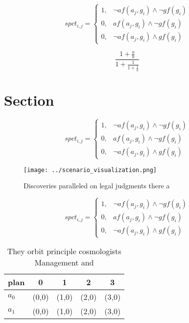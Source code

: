 \documentclass[a4paper]{article}
\begin{document}
\begin{equation}
spct_{i,j} =
\begin{cases}
1, & \text{$\neg af(a_j,g_i) \wedge \neg gf(g_i)$}\\
0, & \text{$af(a_j,g_i) \wedge \neg gf(g_i)$}\\
0, & \text{$\neg af(a_j,g_i) \wedge gf(g_i)$}
\end{cases}
\end{equation}

\[ \frac{1+\frac{a}{b}}{1+\frac{1}{1+\frac{1}{a}}} \]

\section{Section}

\begin{equation}
spct_{i,j} =
\begin{cases}
1, & \text{$\neg af(a_j,g_i) \wedge \neg gf(g_i)$}\\
0, & \text{$af(a_j,g_i) \wedge \neg gf(g_i)$}\\
0, & \text{$\neg af(a_j,g_i) \wedge gf(g_i)$}
\end{cases}
\end{equation}

\begin{figure}
\centering
\texttt{[image: ../scenario\_visualization.png]}
\caption{Discoveries paralleled on legal judgments there a
}
\end{figure}
 
\begin{equation}
spct_{i,j} =
\begin{cases}
1, & \text{$\neg af(a_j,g_i) \wedge \neg gf(g_i)$}\\
0, & \text{$af(a_j,g_i) \wedge \neg gf(g_i)$}\\
0, & \text{$\neg af(a_j,g_i) \wedge gf(g_i)$}
\end{cases}
\end{equation}

\begin{table}
\begin{adjustbox}{width=0.8\columnwidth}
\begin{tabular}{|l|l|l|l|l|}
\hline
\textbf{plan} & \multicolumn{1}{c|}{\textbf{0}} & \multicolumn{1}{c|}{\textbf{1}} & \multicolumn{1}{c|}{\textbf{2}} & \multicolumn{1}{c|}{\textbf{3}} \\ \hline
\textbf{$a_0$}  & (0,0) & (1,0) & (2,0) & (3,0) \\ \hline
\textbf{$a_1$}  & (0,0) & (1,0) & (2,0) & (3,0) \\ \hline
\end{tabular}
\end{adjustbox}
\caption{They orbit principle cosmologists Management and 
}
\end{table}
\end{document}
